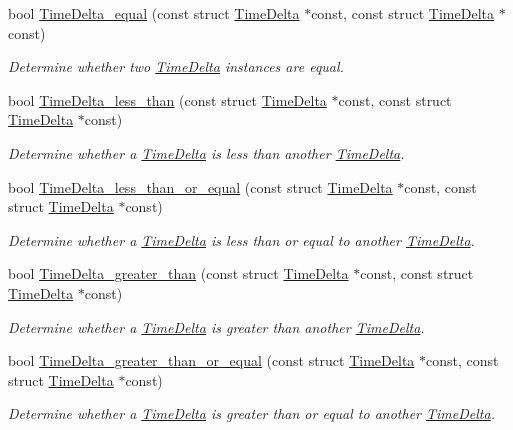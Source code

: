 \begin{DoxyCompactItemize}
bool \hyperlink{time-delta_8h_ae43460348083663634bd5bef6c5ab885}{\-Time\-Delta\-\_\-equal} (const struct \hyperlink{structTimeDelta}{\-Time\-Delta} $\ast$const, const struct \hyperlink{structTimeDelta}{\-Time\-Delta} $\ast$const)
\begin{DoxyCompactList}\small\item\em \-Determine whether two \hyperlink{structTimeDelta}{\-Time\-Delta} instances are equal. \end{DoxyCompactList}\item 
bool \hyperlink{time-delta_8h_a9494ddb1994d09d928a17bc5d8f12a5a}{\-Time\-Delta\-\_\-less\-\_\-than} (const struct \hyperlink{structTimeDelta}{\-Time\-Delta} $\ast$const, const struct \hyperlink{structTimeDelta}{\-Time\-Delta} $\ast$const)
\begin{DoxyCompactList}\small\item\em \-Determine whether a \hyperlink{structTimeDelta}{\-Time\-Delta} is less than another \hyperlink{structTimeDelta}{\-Time\-Delta}. \end{DoxyCompactList}\item 
bool \hyperlink{time-delta_8h_a97644eac25e86eb3b1895cb5a668c25b}{\-Time\-Delta\-\_\-less\-\_\-than\-\_\-or\-\_\-equal} (const struct \hyperlink{structTimeDelta}{\-Time\-Delta} $\ast$const, const struct \hyperlink{structTimeDelta}{\-Time\-Delta} $\ast$const)
\begin{DoxyCompactList}\small\item\em \-Determine whether a \hyperlink{structTimeDelta}{\-Time\-Delta} is less than or equal to another \hyperlink{structTimeDelta}{\-Time\-Delta}. \end{DoxyCompactList}\item 
bool \hyperlink{time-delta_8h_a7ef30d66e1eeea47ea7000775614020e}{\-Time\-Delta\-\_\-greater\-\_\-than} (const struct \hyperlink{structTimeDelta}{\-Time\-Delta} $\ast$const, const struct \hyperlink{structTimeDelta}{\-Time\-Delta} $\ast$const)
\begin{DoxyCompactList}\small\item\em \-Determine whether a \hyperlink{structTimeDelta}{\-Time\-Delta} is greater than another \hyperlink{structTimeDelta}{\-Time\-Delta}. \end{DoxyCompactList}\item 
bool \hyperlink{time-delta_8h_aca2a28b813b68c66a3754ecf311350b8}{\-Time\-Delta\-\_\-greater\-\_\-than\-\_\-or\-\_\-equal} (const struct \hyperlink{structTimeDelta}{\-Time\-Delta} $\ast$const, const struct \hyperlink{structTimeDelta}{\-Time\-Delta} $\ast$const)
\begin{DoxyCompactList}\small\item\em \-Determine whether a \hyperlink{structTimeDelta}{\-Time\-Delta} is greater than or equal to another \hyperlink{structTimeDelta}{\-Time\-Delta}. \end{DoxyCompactList}\end{DoxyCompactItemize}


